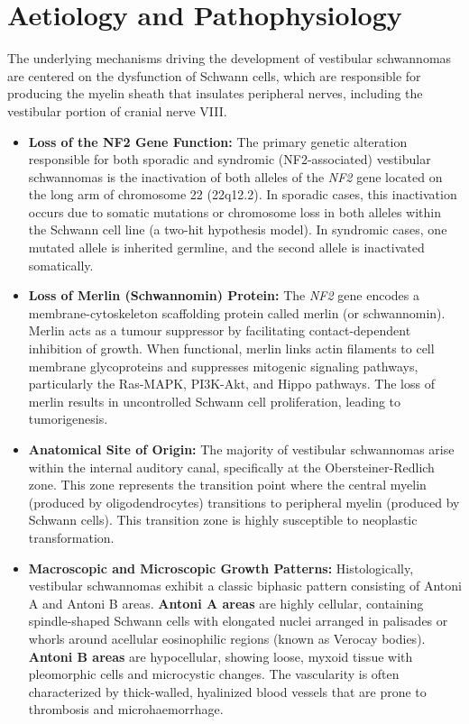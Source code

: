 \section*{Aetiology and Pathophysiology}
The underlying mechanisms driving the development of vestibular schwannomas are centered on the dysfunction of Schwann cells, which are responsible for producing the myelin sheath that insulates peripheral nerves, including the vestibular portion of cranial nerve VIII.
\begin{itemize}
    \item \textbf{Loss of the NF2 Gene Function:} The primary genetic alteration responsible for both sporadic and syndromic (NF2-associated) vestibular schwannomas is the inactivation of both alleles of the \textit{NF2} gene located on the long arm of chromosome 22 (22q12.2). In sporadic cases, this inactivation occurs due to somatic mutations or chromosome loss in both alleles within the Schwann cell line (a two-hit hypothesis model). In syndromic cases, one mutated allele is inherited germline, and the second allele is inactivated somatically.
    \item \textbf{Loss of Merlin (Schwannomin) Protein:} The \textit{NF2} gene encodes a membrane-cytoskeleton scaffolding protein called merlin (or schwannomin). Merlin acts as a tumour suppressor by facilitating contact-dependent inhibition of growth. When functional, merlin links actin filaments to cell membrane glycoproteins and suppresses mitogenic signaling pathways, particularly the Ras-MAPK, PI3K-Akt, and Hippo pathways. The loss of merlin results in uncontrolled Schwann cell proliferation, leading to tumorigenesis.
    \item \textbf{Anatomical Site of Origin:} The majority of vestibular schwannomas arise within the internal auditory canal, specifically at the Obersteiner-Redlich zone. This zone represents the transition point where the central myelin (produced by oligodendrocytes) transitions to peripheral myelin (produced by Schwann cells). This transition zone is highly susceptible to neoplastic transformation.
    \item \textbf{Macroscopic and Microscopic Growth Patterns:} Histologically, vestibular schwannomas exhibit a classic biphasic pattern consisting of Antoni A and Antoni B areas. \textbf{Antoni A areas} are highly cellular, containing spindle-shaped Schwann cells with elongated nuclei arranged in palisades or whorls around acellular eosinophilic regions (known as Verocay bodies). \textbf{Antoni B areas} are hypocellular, showing loose, myxoid tissue with pleomorphic cells and microcystic changes. The vascularity is often characterized by thick-walled, hyalinized blood vessels that are prone to thrombosis and microhaemorrhage.

\end{itemize}
